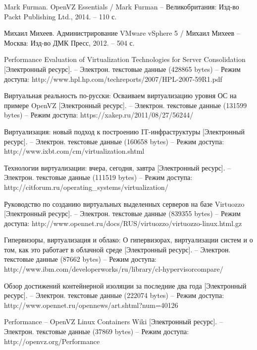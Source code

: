\begin{thebibliography}{00}
    Mark Furman. OpenVZ Essentials /
    Mark Furman -- Великобритания: Изд-во Packt Publishing Ltd.,
    2014. -- 110 с.

    Михаил Михеев. Администрирование VMware vSphere 5 / 
    Михаил Михеев -- Москва: Изд-во ДМК Пресс, 
    2012. -- 504 с.
    
    Performance Evaluation of Virtualization Technologies for Server Consolidation
    [Электронный ресурс]. --
    Электрон. текстовые данные (428865 bytes) --
    Режим доступа: http://www.hpl.hp.com/techreports/2007/HPL-2007-59R1.pdf

    Виртуальная реальность по-русски: Осваиваем виртуализацию уровня ОС на примере OpenVZ
    [Электронный ресурс]. --
    Электрон. текстовые данные (131599 bytes) --
    Режим доступа: https://xakep.ru/2011/08/27/56244/

    Виртуализация: новый подход к построению IT-инфраструктуры
    [Электронный ресурс]. --
    Электрон. текстовые данные (160658 bytes) --
    Режим доступа: http://www.ixbt.com/cm/virtualization.shtml

    Технологии виртуализации: вчера, сегодня, завтра
    [Электронный ресурс]. --
    Электрон. текстовые данные (111519 bytes) --
    Режим доступа: http://citforum.ru/operating\_systems/virtualization/

    Руководство по созданию виртуальных выделенных серверов на базе Virtuozzo
    [Электронный ресурс]. --
    Электрон. текстовые данные (839355 bytes) --
    Режим доступа: http://www.opennet.ru/docs/RUS/virtuozzo/virtuozzo-linux.html.gz

    Гипервизоры, виртуализация и облако: О гипервизорах, виртуализации систем и о том, как это работает в облачной среде
    [Электронный ресурс]. --
    Электрон. текстовые данные (87662 bytes) --
    Режим доступа: http://www.ibm.com/developerworks/ru/library/cl-hypervisorcompare/

    Обзор достижений контейнерной изоляции за последние два года
    [Электронный ресурс]. --
    Электрон. текстовые данные (222074 bytes) -- 
    Режим доступа: http://www.opennet.ru/opennews/art.shtml?num=40126

    Performance -- OpenVZ Linux Containers Wiki
    [Электронный ресурс]. --
    Электрон. текстовые данные (37869 bytes) --
    Режим доступа: http://openvz.org/Performance
\fi

\end{thebibliography}
\endgroup

\clearpage
